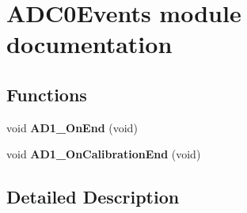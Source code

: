 \hypertarget{group___a_d_c0_events__module}{}\section{A\+D\+C0\+Events module documentation}
\label{group___a_d_c0_events__module}
\subsection*{Functions}
\begin{DoxyCompactItemize}
\item 
\mbox{\label{group___a_d_c0_events__module_gac0b0e33c722d75df2e7b6eb1d50f15a7}} 
void {\bfseries A\+D1\+\_\+\+On\+End} (void)
\item 
\mbox{\label{group___a_d_c0_events__module_ga8be719cad9ac48a9cdfd2281de15ec59}} 
void {\bfseries A\+D1\+\_\+\+On\+Calibration\+End} (void)
\end{DoxyCompactItemize}


\subsection{Detailed Description}
